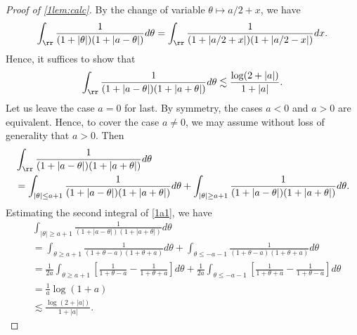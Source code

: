 \begin{proof}[Proof of \cref{1lem:calc}]
%
%
%
By the change of variable $\theta \mapsto a/2 + x$, we have
%
%
\begin{equation*}
	\begin{split}
		\int_{\rr} \frac{1}{(1 + | \theta |)(1 + | a - \theta |)}d \theta
	= \int_{\rr} \frac{1}{(1 + |  a/2 + x |)(1 + | a/2 - x |)}d x.
	\end{split}
\end{equation*}
%
%
Hence, it suffices to show that
%
%
\begin{equation*}
	\begin{split}
		\int_{\rr} \frac{1}{(1 + | a - \theta |)(1 + | a + \theta |)}d \theta
		\lesssim \frac{\log(2 + | a |)}{1 + | a |}.
	\end{split}
\end{equation*}
%
%
Let us leave the case $a = 0$ for last. By symmetry, the cases $a<0$ and $a >0$
are equivalent. Hence, to cover the case $a \neq0$, we may assume
without loss of generality that $a >0$.
%
%
Then
\begin{equation}
	\label{1a1}
	\begin{split}
		& \int_{\rr} \frac{1}{(1 + | a - \theta |)(1 + | a + \theta |)}d \theta
		\\
		& = \int_{| \theta| \le a+1 } \frac{1}{(1 + | a - \theta |)(1 + | a + \theta
		|)}d \theta + \int_{| \theta| \ge a+1 } \frac{1}{(1 + | a - \theta |)(1 + |
		a + \theta |)}d \theta.
	\end{split}
\end{equation}
Estimating the second integral of \eqref{1a1}, we have
\begin{equation*}
	\begin{split}
		& \int_{| \theta| \ge a+1 } \frac{1}{(1 + | a - \theta |)(1 + | a + \theta
		|)}d \theta 
		\\
		& = \int_{\theta \ge a + 1} \frac{1}{(1 + \theta-a)(1 + \theta+a)} d \theta
		+ \int_{\theta \le -a -1} \frac{1}{(1 + \theta - a) (1 + \theta + a)}d \theta
		\\
		& = \frac{1}{2a} \int_{\theta \ge a + 1} \left[ \frac{1}{1 + \theta -a} -
		\frac{1}{1 + \theta+a} \right] d \theta
		+ \frac{1}{2a} \int_{\theta \le -a-1} \left[ \frac{1}{1 + \theta+a}
		-\frac{1}{1 + \theta -a} \right] d \theta
		\\
		& = \frac{1}{a} \log(1+a)
		\\
		& \lesssim \frac{\log(2 + |a|)}{1 + | a |}.
	\end{split}
\end{equation*}

\end{proof}
